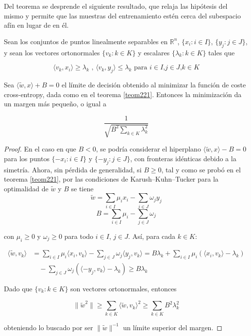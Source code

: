 Del teorema se desprende el siguiente resultado, que relaja las hipótesis del mismo y permite que las muestras del entrenamiento estén cerca del subespacio afín en lugar de en él.

\begin{corolario}
Sean los conjuntos de puntos linealmente separables en $\mathbb{R}^n$, $\{x_i: i \in I\}$, $\{y_j: j \in J\}$, y sean los vectores ortonormales $\{v_k: k \in K\}$ y escalares $\{\lambda_k: k \in K\}$ tales que 

$$ \langle v_k,x_i \rangle \geq \lambda_k \text{ , } \langle v_k,y_j \rangle \leq \lambda_k \text{ para } i \in I \text{,}j \in J \text{,} k \in K$$

Sea $\langle \tilde{w},x \rangle + B=0$ el límite de decisión obtenido al minimizar la función de coste cross-entropy, dada como en el teorema \ref{teom221}. Entonces la minimización da un margen más pequeño, o igual a

$$\frac{1}{\sqrt{B^2 \sum_{k \in K} \lambda_k^2}}$$
\end{corolario}

\begin{proof}
En el caso en que $B < 0$, se podría considerar el hiperplano $\langle \tilde{w},x \rangle - B=0$ para los puntos $\{-x_i: i \in I\}$ y $\{-y_j: j \in J\}$, con fronteras idénticas debido a la simetría. Ahora, sin pérdida de generalidad, si $B \geq 0$, tal y como se probó en el teorema \ref{teom221}, por las condiciones de Karush–Kuhn–Tucker para la optimalidad de $\tilde{w}$ y $B$ se tiene
$$\tilde{w} = \sum_{i \in I} \mu_i x_i - \sum_{j \in J} \omega_j y_j$$
$$B = \sum_{i \in I} \mu_i - \sum_{j \in J} \omega_j$$

con $\mu_i \geq 0$ y $\omega_j \geq 0$ para todo $i \in I$, $j \in J$. Así, para cada $k \in K$:

\begin{align*}
\langle \tilde{w},v_k \rangle &= \sum_{i \in I} \mu_i \langle x_i,v_k \rangle - \sum_{j \in J} \omega_j \langle y_j,v_k \rangle = B \lambda_k + \sum_{i \in I} \mu_i (\langle x_i,v_k \rangle - \lambda_k) \\
&\quad -\sum_{j \in J} \omega_j (\langle -y_j,v_k \rangle - \lambda_k) \geq B \lambda_k
\end{align*}

Dado que $\{v_k: k \in K\}$ son vectores ortonormales, entonces

$$\|\tilde{w}^2 \| \geq \sum_{k \in K} \langle \tilde{w},v_k \rangle^2 \geq \sum_{k \in K} B^2 \lambda_k^2$$

obteniendo lo buscado por ser $\|\tilde{w} \|^{-1}$ un límite superior del margen.

\end{proof}

